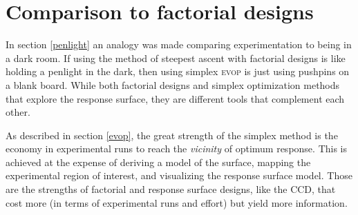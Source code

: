 \section{Comparison to factorial designs}
In section \ref{penlight} an analogy was made comparing experimentation to being in a dark room.  If using the method of steepest ascent with factorial designs is like holding a penlight in the dark, then using simplex \textsc{evop} is just using pushpins on a blank board.  While both factorial designs and simplex optimization methods that explore the response surface, they are different tools that complement each other.  

As described in section \ref{evop}, the great strength of the simplex method is the economy in experimental runs to reach the \textit{vicinity} of  optimum response.  This is achieved at the expense of deriving a model of the surface, mapping the experimental region of interest, and visualizing the response surface model.  Those are the strengths of factorial and response surface designs, like the CCD, that cost more (in terms of experimental runs and effort) but yield more information.